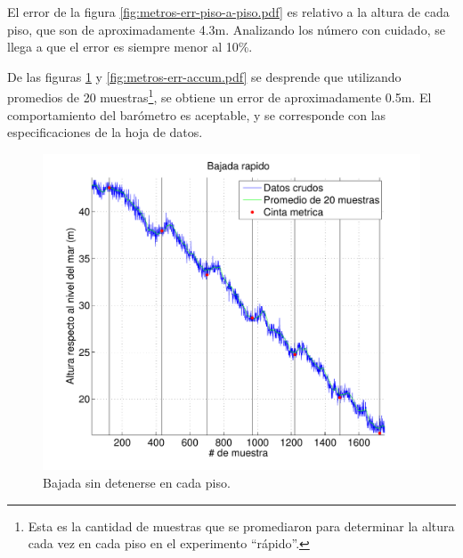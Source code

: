 \documentclass[main]{subfiles}
\begin{document}
El error de la figura \ref{fig:metros-err-piso-a-piso.pdf} es relativo a la altura de cada piso, que son de aproximadamente 4.3m. Analizando los número con cuidado, se llega a que el error es siempre menor al 10\%.

De las figuras \ref{fig:metros-rapido.pdf} y \ref{fig:metros-err-accum.pdf} se desprende que utilizando promedios de 20 muestras\footnote{Esta es la cantidad de muestras que se promediaron para determinar la altura cada vez en cada piso en el experimento ``rápido''.}, se obtiene un error de aproximadamente 0.5m. El comportamiento del barómetro es aceptable, y se corresponde con las especificaciones de la hoja de datos.


\newpage
\vspace{-40pt}
\begin{figure}[h!]
\centering
  \includegraphics[width=.95\textwidth]{./pics_barom/metros-rapido.pdf}
  \caption{Bajada sin detenerse en cada piso.}
  \label{fig:metros-rapido.pdf}
\end{figure}
\end{document}

